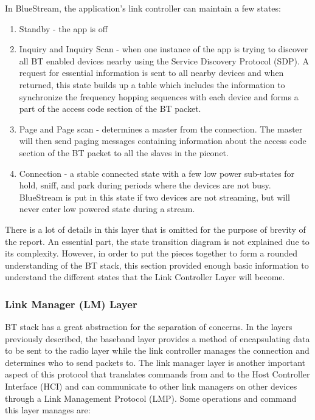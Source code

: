 \documentclass[a4paper,12pt]{article}
\begin{document}
In BlueStream, the application’s link controller can maintain a few states:

\begin{enumerate}
\item Standby - the app is off
\item Inquiry and Inquiry Scan - when one instance of the app is trying to discover all BT enabled devices nearby using the Service Discovery Protocol (SDP). A request for essential information is sent to all nearby devices and when returned, this state builds up a table which includes the information to synchronize the frequency hopping sequences with each device and forms a part of the access code section of the BT packet. 
\item Page and Page scan - determines a master from the connection. The master will then send paging messages containing information about the access code section of the BT packet to all the slaves in the piconet. 
\item Connection - a stable connected state with a few low power sub-states for hold, sniff, and park during periods where the devices are not busy. BlueStream is put in this state if two devices are not streaming, but will never enter low powered state during a stream. 
\end{enumerate}

There is a lot of details in this layer that is omitted for the purpose of brevity of the report. An essential part, the state transition diagram is not explained due to its complexity. However, in order to put the pieces together to form a rounded understanding of the BT stack, this section provided enough basic information to understand the different states that the Link Controller Layer will become.

\subsubsection{Link Manager (LM) Layer}
BT stack has a great abstraction for the separation of concerns. In the layers previously described, the baseband layer provides a method of encapsulating data to be sent to the radio layer while the link controller manages the connection and determines who to send packets to. The link manager layer is another important aspect of this protocol that translates commands from and to the Host Controller Interface (HCI) and can communicate to other link managers on other devices through a Link Management Protocol (LMP). Some operations and command this layer manages are:
\end{document}
